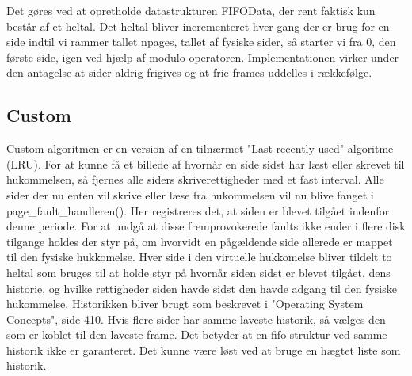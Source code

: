 Det gøres ved at opretholde datastrukturen FIFOData, der rent faktisk kun består af et heltal. Det heltal bliver incrementeret hver gang der er brug for en side indtil vi rammer tallet npages, tallet af fysiske sider, så starter vi fra 0, den første side, igen ved hjælp af modulo operatoren. Implementationen virker under den antagelse at sider aldrig frigives og at frie frames uddelles i rækkefølge.

\subsection{Custom}
Custom algoritmen er en version af en tilnærmet "Last recently used"-algoritme (LRU). For at kunne få et billede af hvornår en side sidst har læst eller skrevet til hukommelsen, så fjernes alle siders skriverettigheder med et fast interval. Alle sider der nu enten vil skrive eller læse fra hukommelsen vil nu blive fanget i page_fault_handleren(). Her registreres det, at siden er blevet tilgået indenfor denne periode. For at undgå at disse fremprovokerede faults ikke ender i flere disk tilgange holdes der styr på, om hvorvidt en pågældende side allerede er mappet til den fysiske hukkomelse.
Hver side i den virtuelle hukkomelse bliver tildelt to heltal som bruges til at holde styr på hvornår siden sidst er blevet tilgået, dens historie, og hvilke rettigheder siden havde sidst den havde adgang til den fysiske hukommelse. Historikken bliver brugt som beskrevet i "Operating System Concepts", side 410. Hvis flere sider har samme laveste historik, så vælges den som er koblet til den laveste frame. Det betyder at en fifo-struktur ved samme historik ikke er garanteret. Det kunne være løst ved at bruge en hægtet liste som historik.
